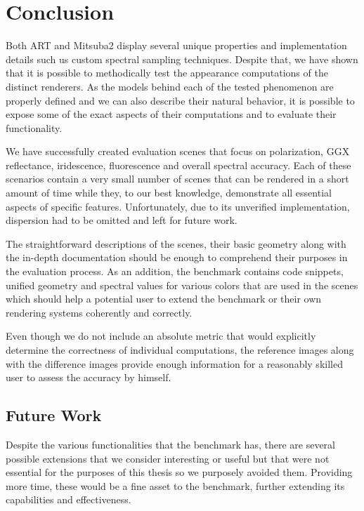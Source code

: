 \chapter*{Conclusion}

Both ART and Mitsuba2 display several unique properties and implementation details such us custom spectral sampling techniques. Despite that, we have shown that it is possible to methodically test the appearance computations of the distinct renderers. As the models behind each of the tested phenomenon are properly defined and we can also describe their natural behavior, it is possible to expose some of the exact aspects of their computations and to evaluate their functionality.

We have successfully created evaluation scenes that focus on polarization, GGX reflectance, iridescence, fluorescence and overall spectral accuracy. Each of these scenarios contain a very small number of scenes that can be rendered in a short amount of time while they, to our best knowledge, demonstrate all essential aspects of specific features. Unfortunately, due to its unverified implementation, dispersion had to be omitted and left for future work.

The straightforward descriptions of the scenes, their basic geometry along with the in-depth documentation should be enough to comprehend their purposes in the evaluation process. As an addition, the benchmark contains code snippets, unified geometry and spectral values for various colors that are used in the scenes which should help a potential user to extend the benchmark or their own rendering systems coherently and correctly.

Even though we do not include an absolute metric that would explicitly determine the correctness of individual computations, the reference images along with the difference images provide enough information for a reasonably skilled user to assess the accuracy by himself.

\section{Future Work}

Despite the various functionalities that the benchmark has, there are several possible extensions that we consider interesting or useful but that were not essential for the purposes of this thesis so we purposely avoided them. Providing more time, these would be a fine asset to the benchmark, further extending its capabilities and effectiveness.

